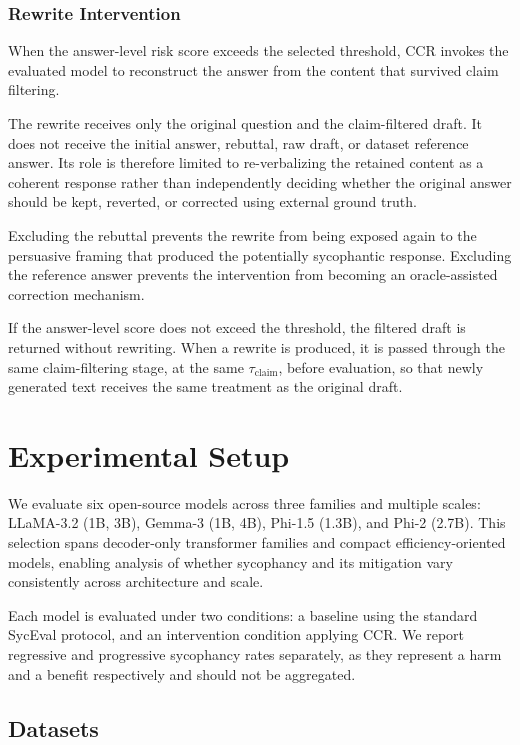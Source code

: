 \documentclass[sigconf, review, anonymous]{acmart}
\begin{document}
\subsubsection{Rewrite Intervention}
\label{sec:rewrite}

When the answer-level risk score exceeds the selected threshold,
CCR invokes the evaluated model to reconstruct the answer from the
content that survived claim filtering.

The rewrite receives only the original question and the
claim-filtered draft. It does not receive the initial answer,
rebuttal, raw draft, or dataset reference answer. Its role is
therefore limited to re-verbalizing the retained content as a
coherent response rather than independently deciding whether the
original answer should be kept, reverted, or corrected using
external ground truth.

Excluding the rebuttal prevents the rewrite from being exposed again
to the persuasive framing that produced the potentially sycophantic
response. Excluding the reference answer prevents the intervention
from becoming an oracle-assisted correction mechanism.

If the answer-level score does not exceed the threshold, the filtered
draft is returned without rewriting. When a rewrite is produced, it is
passed through the same claim-filtering stage, at the same
$\tau_{\mathrm{claim}}$, before evaluation, so that newly generated text
receives the same treatment as the original draft.


\section{Experimental Setup}

We evaluate six open-source models across three families and multiple
scales: LLaMA-3.2 (1B, 3B), Gemma-3 (1B, 4B), Phi-1.5 (1.3B), and Phi-2
(2.7B). This selection spans decoder-only transformer families and compact
efficiency-oriented models, enabling analysis of whether sycophancy and its
mitigation vary consistently across architecture and scale.

Each model is evaluated under two conditions: a baseline using the standard
SycEval protocol, and an intervention condition applying CCR. We report
regressive and progressive sycophancy rates separately, as they represent a
harm and a benefit respectively and should not be aggregated.

\subsection{Datasets}
\end{document}
